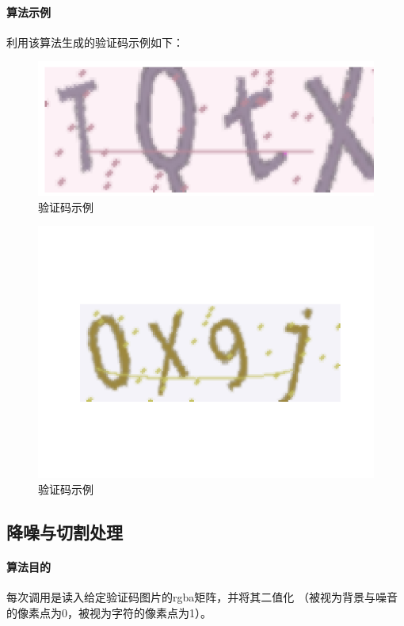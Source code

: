\documentclass[11pt,UTF8]{article}
\begin{document}
\paragraph{算法示例}
	利用该算法生成的验证码示例如下：
	\begin{figure}[H]
		\centering
		\includegraphics[width=\textwidth]{TQtx.png}
		\caption{验证码示例}\label{results}
	\end{figure}
	\begin{figure}[H]
		\centering
		\includegraphics[width=\textwidth]{0X9j.png}
		\caption{验证码示例}\label{results}
	\end{figure}
\newpage
\subsection{降噪与切割处理}
\paragraph{算法目的}
	每次调用是读入给定验证码图片的rgba矩阵，并将其二值化
	（被视为背景与噪音的像素点为0，被视为字符的像素点为1）。
	
\end{document}
